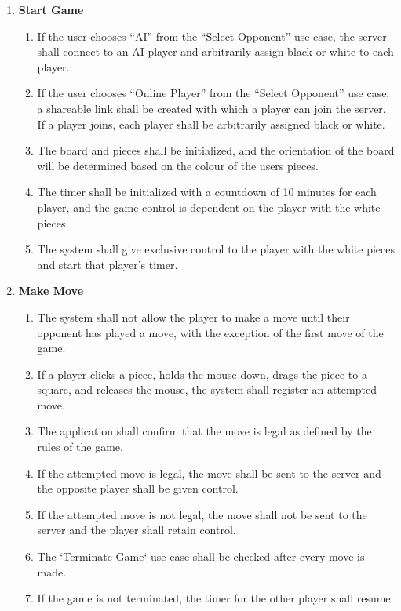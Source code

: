 \documentclass[]{article}
\begin{document}
\begin{enumerate}[{UC}1.]
	\item \textbf{Start Game}
	\begin{enumerate}[{FR}1., resume]
		\item If the user chooses ``AI'' from the ``Select Opponent'' use case, the server shall connect to an AI player and arbitrarily assign black or white to each player.
		\item If the user chooses ``Online Player'' from the ``Select Opponent'' use case, a shareable link shall be created with which a player can join the server. If a player joins, each player shall be arbitrarily assigned black or white.
		\item The board and pieces shall be initialized, and the orientation of the board will be determined based on the colour of the users pieces. 
		\item The timer shall be initialized with a countdown of 10 minutes for each player, and the game control is dependent on the player with the white pieces.
		\item The system shall give exclusive control to the player with the white pieces and start that player's timer.
	\end{enumerate}
	
	\item \textbf{Make Move}
	\begin{enumerate}[{FR}1., resume]
		\item The system shall not allow the player to make a move until their opponent has played a move, with the exception of the first move of the game.
		\item If a player clicks a piece, holds the mouse down, drags the piece to a square, and releases the mouse, the system shall register an attempted move.
		\item The application shall confirm that the move is legal as defined by the rules of the game. 
		\item If the attempted move is legal, the move shall be sent to the server and the opposite player shall be given control.
		\item If the attempted move is not legal, the move shall not be sent to the server and the player shall retain control.
		\item The `Terminate Game` use case shall be checked after every move is made.
		\item If the game is not terminated, the timer for the other player shall resume.
	\end{enumerate}
	

\end{enumerate}
\end{document}
